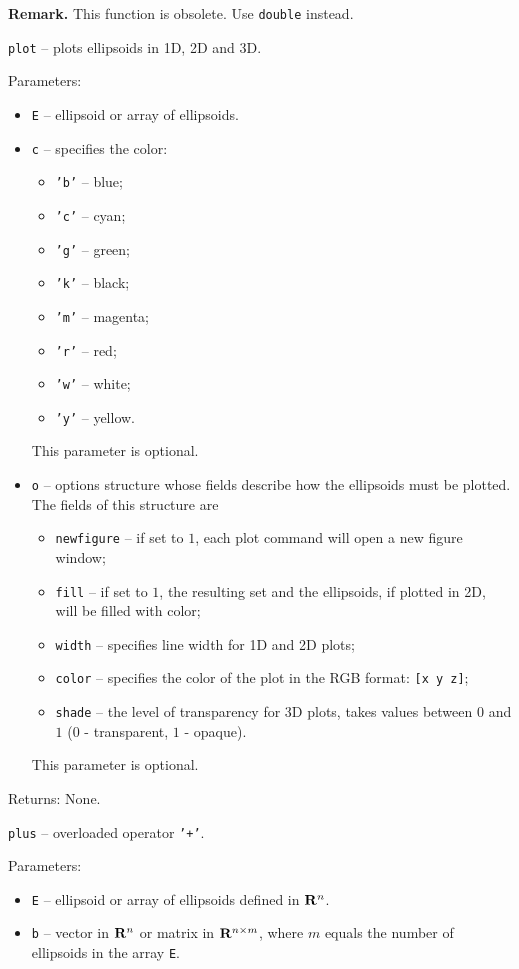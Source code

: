 {\bf Remark.} This function is obsolete. Use {\tt double} instead.

\newpage

{\Large {\tt plot}} -- plots ellipsoids in 1D, 2D and 3D.

Parameters:
\begin{itemize}
\item {\tt E} -- ellipsoid or array of ellipsoids.
\item {\tt c} -- specifies the color:
\begin{itemize}
\item {\tt 'b'} -- blue;
\item {\tt 'c'} -- cyan;
\item {\tt 'g'} -- green;
\item {\tt 'k'} -- black;
\item {\tt 'm'} -- magenta;
\item {\tt 'r'} -- red;
\item {\tt 'w'} -- white;
\item {\tt 'y'} -- yellow.
\end{itemize}
This parameter is optional.
\item {\tt o} -- options structure whose fields describe how the ellipsoids
must be plotted. The fields of this structure are
\begin{itemize}
\item {\tt newfigure} -- if set to $1$, each plot command will open a new
figure window;
\item {\tt fill} -- if set to $1$, the resulting set and the ellipsoids,
if plotted in 2D, will be filled with color;
\item {\tt width} -- specifies line width for 1D and 2D plots;
\item {\tt color} -- specifies the color of the plot in the RGB format:
{\tt [x y z]};
\item {\tt shade} -- the level of transparency for 3D plots, takes values
between $0$ and $1$ ($0$ - transparent, $1$ - opaque).
\end{itemize}
This parameter is optional.
\end{itemize}

Returns: None.

\newpage

{\Large {\tt plus}} -- overloaded operator {\tt '+'}.

Parameters:
\begin{itemize}
\item {\tt E} -- ellipsoid or array of ellipsoids defined in ${\bf R}^n$.
\item {\tt b} -- vector in ${\bf R}^n$ or matrix in ${\bf R}^{n\times m}$,
where $m$ equals the number of ellipsoids in the array {\tt E}.
\end{itemize}

